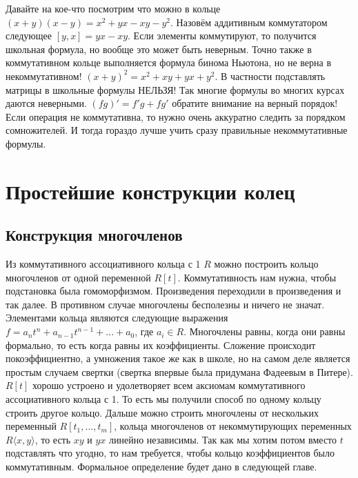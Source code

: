 Давайте на кое-что посмотрим что можно в кольце $(x+y)(x-y)=x^2+yx-xy-y^2$.
Назовём аддитивным коммутатором следующее $[y,x]=yx-xy$. Если элементы
коммутируют, то получится школьная формула, но вообще это может быть неверным.
Точно также в коммутативном кольце выполняется формула бинома Ньютона, но не
верна в некоммутативном! $(x+y)^2=x^2+xy+yx+y^2$. В частности подставлять
матрицы в школьные формулы НЕЛЬЗЯ! Так многие формулы во многих курсах даются
неверными. $(fg)'=f'g+fg'$ обратите внимание на верный порядок! Если операция
не коммутативна, то нужно очень аккуратно следить за порядком сомножителей. И
тогда гораздо лучше учить сразу правильные некоммутативные формулы.

\section{Простейшие конструкции колец}
\subsection{Конструкция многочленов}
Из коммутативного ассоциативного кольца с 1 $R$ можно построить
кольцо многочленов от одной переменной $R[t]$. Коммутативность нам
нужна, чтобы подстановка была гомоморфизмом. Произведения переходили в
произведения и так далее. В противном случае многочлены бесполезны и 
ничего не значат. Элементами кольца являются следующие выражения $f=a_n
t^n + a_{n-1}t^{n-1}+...+a_0$, где $a_i\in R$. Многочлены равны, когда
они равны формально, то есть когда равны их коэффициенты. Сложение
происходит покоэффициентно, а умножения такое же как в школе, но на
самом деле является простым случаем свертки (свертка впервые была
придумана Фадеевым в Питере). $R[t]$ хорошо устроено и удолетворяет всем
аксиомам коммутативного ассоциативного кольца с 1. То есть мы получили
способ по одному кольцу строить другое кольцо. Дальше можно строить
многочлены от нескольких переменный $R[t_1,...,t_m]$, кольца многочленов
от некоммутирующих переменных $R\langle x,y\rangle$, то есть $xy$ и $yx$
линейно независимы. Так как мы хотим потом вместо $t$ подставлять что
угодно, то нам требуется, чтобы кольцо коэффициентов было коммутативным.
Формальное определение будет дано в следующей главе.

